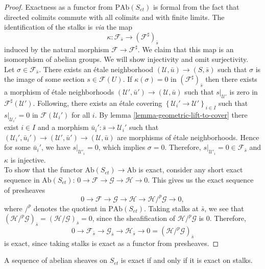 \begin{proof}
Exactness as a functor from $\text{PAb}(S_{et})$ is formal from the fact that
directed colimits commute with all colimits and with finite limits. The
identification of the stalks is {\it via} the map
$$
\kappa : \mathcal{F}_{\bar s}\longrightarrow
\left(\mathcal{F}^\sharp\right)_{\bar s}
$$
induced by the natural morphism $\mathcal{F}\to \mathcal{F}^\sharp$. We claim
that this map is an isomorphism of abelian groups. We will show injectivity
and omit surjectivity.
\\
Let $\sigma\in \mathcal{F}_{\bar s}$. There exists an \'etale neighborhood
$(\mathcal{U}, \bar u)\to (S, \bar s)$ such that $\sigma$ is the image of some
section $s \in \mathcal{F}(U)$. If $\kappa(\sigma) = 0$ in
$(\mathcal{F}^\sharp)_{\bar s}$ then there exists a morphism of \'etale
neighborhoods $(\mathcal{U}', \bar u')\to (\mathcal{U}, \bar u)$ such that
$s|_{\mathcal{U}'}$ is zero in $\mathcal{F}^\sharp(\mathcal{U}')$. Following,
there exists an \'etale covering $\left\{\mathcal{U}_i'\to
\mathcal{U}'\right\}_{i\in I}$ such that $s|_{\mathcal{U}_i'}=0$ in
$\mathcal{F}(\mathcal{U}_i')$ for all $i$. By lemma
\ref{lemma-geometric-lift-to-cover} there exist $i \in I$ and a morphism $\bar
u_i': \bar s \to \mathcal{U}_i'$ such that $(\mathcal{U}_i', \bar u_i')\to
(\mathcal{U}', \bar u')\to (\mathcal{U}, \bar u)$ are morphisms of \'etale
neighborhoods. Hence for some $\bar u_i'$, we have $s|_{\mathcal{U}'_i}=0$,
which implies $\sigma = 0$. Therefore, $s|_{\mathcal{U}'_i} = 0 \in
\mathcal{F}_{\bar s}$ and $\kappa$ is injective.
\\
To show that the functor $\text{Ab}(S_{et}) \to \text{Ab}$ is exact, consider
any short exact sequence in $\text{Ab}(S_{et})$:
$
0\to \mathcal{F}\to \mathcal{G}\to \mathcal H \to 0.
$
This gives us the exact sequence of presheaves
$$
0 \to \mathcal{F}\to \mathcal{G} \to \mathcal H\to \mathcal H/^p\mathcal{G} \to
0,
$$
where $/^p$ denotes the quotient in $\text{PAb}(S_{et})$. Taking stalks at
$\bar s$, we see that $(\mathcal H /^p\mathcal{G})_{\bar{s}} = (\mathcal H
/\mathcal{G})_{\bar{s}} = 0$, since the sheafification of $\mathcal
H/^p\mathcal{G}$ is $0$.
Therefore,
$$
0\to \mathcal{F}_{\bar s	} \to \mathcal{G}_{\bar s} \to
\mathcal{H}_{\bar s} \to 0 = (\mathcal H/^p\mathcal{G})_{\bar s}
$$
is exact, since taking stalks is exact as a functor from presheaves.
\end{proof}

\begin{theorem}
\label{theorem-exactness-stalks}
A sequence of abelian sheaves on
$S_{et}$ is exact if and only if it is exact on stalks.
\end{theorem}

